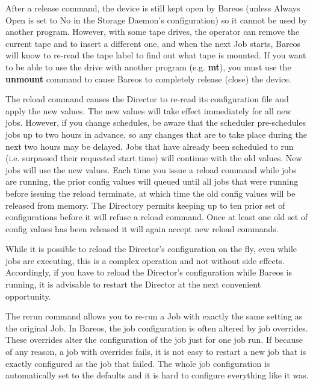 \begin{description}
{   After a release command, the device is still kept open by Bareos (unless
   Always Open is set to No in the Storage Daemon's configuration) so it
   cannot be used by another program.  However, with some tape drives, the
   operator can remove the current tape and to insert a different one, and
   when the next Job starts, Bareos will know to re-read the tape label to
   find out what tape is mounted.  If you want to be able to use the drive
   with another program (e.g.  {\bf mt}), you must use the {\bf unmount}
   command to cause Bareos to completely release (close) the device.

\item [reload]
   The reload command causes the Director to re-read its configuration
   file and apply the new values. The new values will take effect
   immediately for all new jobs.  However, if you change schedules,
   be aware that the scheduler pre-schedules jobs up to two hours in
   advance, so any changes that are to take place during the next two
   hours may be delayed.  Jobs that have already been scheduled to run
   (i.e. surpassed their requested start time) will continue with the
   old values.  New jobs will use the new values. Each time you issue
   a reload command while jobs are running, the prior config values
   will queued until all jobs that were running before issuing
   the reload terminate, at which time the old config values will
   be released from memory. The Directory permits keeping up to
   ten prior set of configurations before it will refuse a reload
   command. Once at least one old set of config values has been
   released it will again accept new reload commands.

   While it is possible to reload the Director's configuration on the fly,
   even while jobs are executing, this is a complex operation and not
   without side effects.  Accordingly, if you have to reload the Director's
   configuration while Bareos is running, it is advisable to restart the
   Director at the next convenient opportunity.

\item [rerun]
   The rerun command allows you to re-run a Job with exactly the same setting
   as the original Job. In Bareos, the job configuration is often altered by job
   overrides. These overrides alter the configuration of the job just for one job run.
   If because of any reason, a job with overrides fails, it is not easy to restart
   a new job that is exactly configured as the job that failed. The whole job
   configuration is automatically set to the defaults and it is hard to
   configure everything like it was.

}
\end{description}
